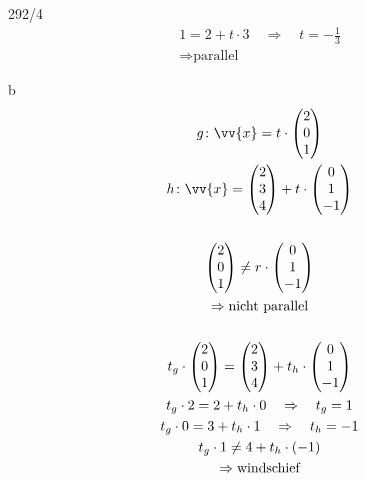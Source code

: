 \begin{exercise}{292/4}
\begin{gather*}
    1 = 2 + t \cdot 3 \quad\Rightarrow\quad t = -\frac{1}{3} \\
    \Rightarrow \text{parallel}
  \end{gather*}
  \item [b]
  \begin{gather*}
    g \colon \vv{x} = t \cdot \begin{pmatrix}2 \\ 0 \\ 1\end{pmatrix} \\
    h \colon \vv{x} = \begin{pmatrix}2 \\ 3 \\ 4\end{pmatrix} + t \cdot \begin{pmatrix}0 \\ 1 \\ -1\end{pmatrix} \\\\
    \begin{pmatrix}2 \\ 0 \\ 1\end{pmatrix} \neq r \cdot \begin{pmatrix}0 \\ 1 \\ -1\end{pmatrix} \\
    \Rightarrow \text{nicht parallel} \\\\
    t_g \cdot \begin{pmatrix}2 \\ 0 \\ 1\end{pmatrix} = \begin{pmatrix}2 \\ 3 \\ 4\end{pmatrix} + t_h \cdot \begin{pmatrix}0 \\ 1 \\ -1\end{pmatrix} \\
    t_g \cdot 2 = 2 + t_h \cdot 0 \quad\Rightarrow\quad t_g = 1 \\
    t_g \cdot 0 = 3 + t_h \cdot 1 \quad\Rightarrow\quad t_h = -1 \\
    t_g \cdot 1 \neq 4 + t_h \cdot (-1) \\
    \Rightarrow \text{windschief}
  \end{gather*}
\end{exercise}
